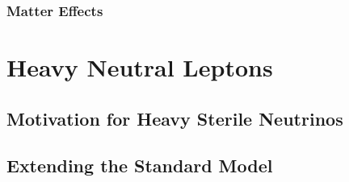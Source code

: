 \subsubsection{Matter Effects}



\section{Heavy Neutral Leptons} 

\subsection{Motivation for Heavy Sterile Neutrinos}

\subsection{Extending the Standard Model}


